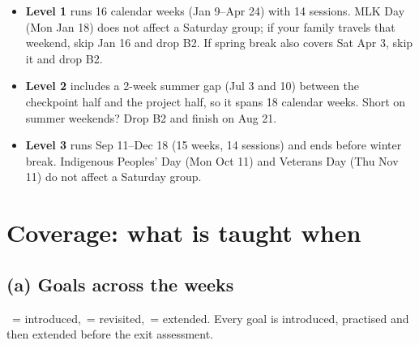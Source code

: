 \documentclass[level=1,teacher]{kidscode}
\begin{document}
\begin{itemize}[itemsep=2pt]
  \item \textbf{Level 1} runs 16 calendar weeks (Jan 9--Apr 24) with 14 sessions. MLK Day (Mon Jan 18) does
        not affect a Saturday group; if your family travels that weekend, skip Jan 16 and drop B2.
        If spring break also covers Sat Apr 3, skip it and drop B2.
  \item \textbf{Level 2} includes a 2-week summer gap (Jul 3 and 10) between the checkpoint half and the
        project half, so it spans 18 calendar weeks. Short on summer weekends? Drop B2 and finish on Aug 21.
  \item \textbf{Level 3} runs Sep 11--Dec 18 (15 weeks, 14 sessions) and ends before winter break.
        Indigenous Peoples' Day (Mon Oct 11) and Veterans Day (Thu Nov 11) do not affect a Saturday group.
\end{itemize}

\section{Coverage: what is taught when}

\subsection{(a) Goals across the weeks}
\cvI\ = introduced,\quad \cvR\ = revisited,\quad \cvE\ = extended. Every goal is introduced, practised
and then extended before the exit assessment.
\end{document}
